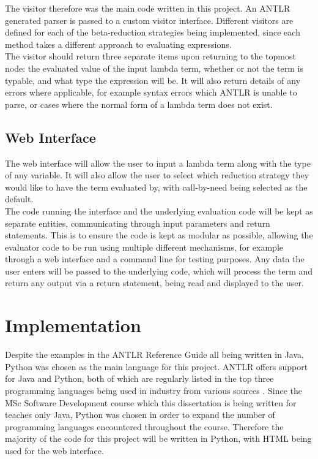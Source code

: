 \documentclass[a4paper,11pt]{report}
\begin{document}
The visitor therefore was the main code written in this project. An ANTLR generated parser is passed to a custom visitor interface. Different visitors are defined for each of the beta-reduction strategies being implemented, since each method takes a different approach to evaluating expressions.\\

The visitor should return three separate items upon returning to the topmost node: the evaluated value of the input lambda term, whether or not the term is typable, and what type the expression will be. It will also return details of any errors where applicable, for example syntax errors which ANTLR is unable to parse, or cases where the normal form of a lambda term does not exist.

\subsection{Web Interface}

The web interface will allow the user to input a lambda term along with the type of any variable. It will also allow the user to select which reduction strategy they would like to have the term evaluated by, with call-by-need being selected as the default.\\

The code running the interface and the underlying evaluation code will be kept as separate entities, communicating through input parameters and return statements. This is to ensure the code is kept as modular as possible, allowing the evaluator code to be run using multiple different mechanisms, for example through a web interface and a command line for testing purposes. Any data the user enters will be passed to the underlying code, which will process the term and return any output via a return statement, being read and displayed to the user.

\section{Implementation}

Despite the examples in the ANTLR Reference Guide \cite{Parr2012} all being written in Java, Python was chosen as the main language for this project. ANTLR offers support for Java and Python, both of which are regularly listed in the top three programming languages being used in industry from various sources \cite{ProgLang1}\cite{ProgLang2}\cite{ProgLang3}. Since the MSc Software Development course which this dissertation is being written for teaches only Java, Python was chosen in order to expand the number of programming languages encountered throughout the course. Therefore the majority of the code for this project will be written in Python, with HTML being used for the web interface.
\end{document}
